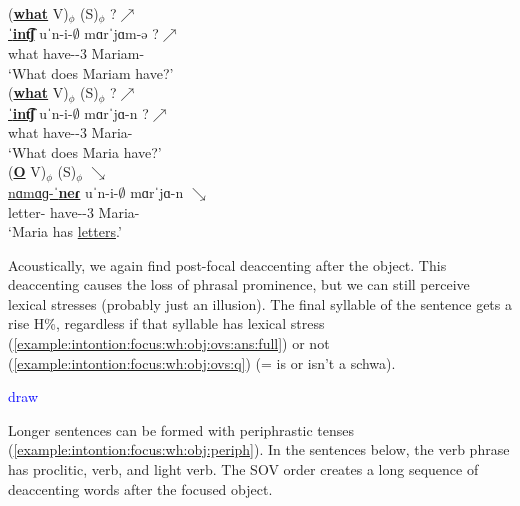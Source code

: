 \begin{exe}
	\ex \label{example:intontion:focus:wh:obj:ovs} \begin{xlist}
		\ex \glll  (\underline{\textbf{what}} V)$_\phi$  ({S})$_\phi$ ?$\nearrow$ \\
		\underline{ˈ\textbf{int͡ʃ}} uˈn-i-$\emptyset$ mɑrˈ{jɑ}m-ə  ?$\nearrow$ \\
		what have-{\thgloss}-3{\sg} Mariam-{} \\ 
		\trans `What does Mariam have?' 
		\label{example:intontion:focus:wh:obj:ovs:q}
		\\ 
		\ex \glll  (\underline{\textbf{what}} V)$_\phi$  ({S})$_\phi$ ?$\nearrow$ \\
		\underline{ˈ\textbf{int͡ʃ}} uˈn-i-$\emptyset$ mɑrˈ{jɑ-n}   ?$\nearrow$ \\
		what have-{\thgloss}-3{\sg} Maria-{} \\ 
		\trans `What does Maria have?' 
		\label{example:intontion:focus:wh:obj:ovs:ans:full}
		\\ 
		\ex \glll  (\underline{\textbf{O}} V)$_\phi$  ({S})$_\phi$ $\searrow$ \\
		\underline{nɑmɑɡ-ˈ\textbf{neɾ}} uˈn-i-$\emptyset$   mɑrˈ{jɑ-n} $\searrow$ \\
		letter-{\pl} have-{\thgloss}-3{\sg} Maria-{}  \\ 
		\trans `Maria has \underline{letters}.'
		\label{example:intontion:focus:wh:obj:ovs:ans:schwa}
		\\ 
	\end{xlist}
\end{exe}


Acoustically, we again find post-focal deaccenting after the object. This deaccenting causes the loss of phrasal prominence, but we can still perceive lexical stresses (probably just an illusion).  The final syllable of the sentence gets a rise H\%, regardless if that syllable has lexical stress (\ref{example:intontion:focus:wh:obj:ovs:ans:full}) or not (\ref{example:intontion:focus:wh:obj:ovs:q}) (= is or isn't a schwa). 

\textcolor{blue}{draw}

Longer sentences can be formed with periphrastic tenses (\ref{example:intontion:focus:wh:obj:periph}). In the sentences below, the verb phrase has proclitic, verb, and light verb. The SOV order creates a long sequence of deaccenting words after the focused object. 

